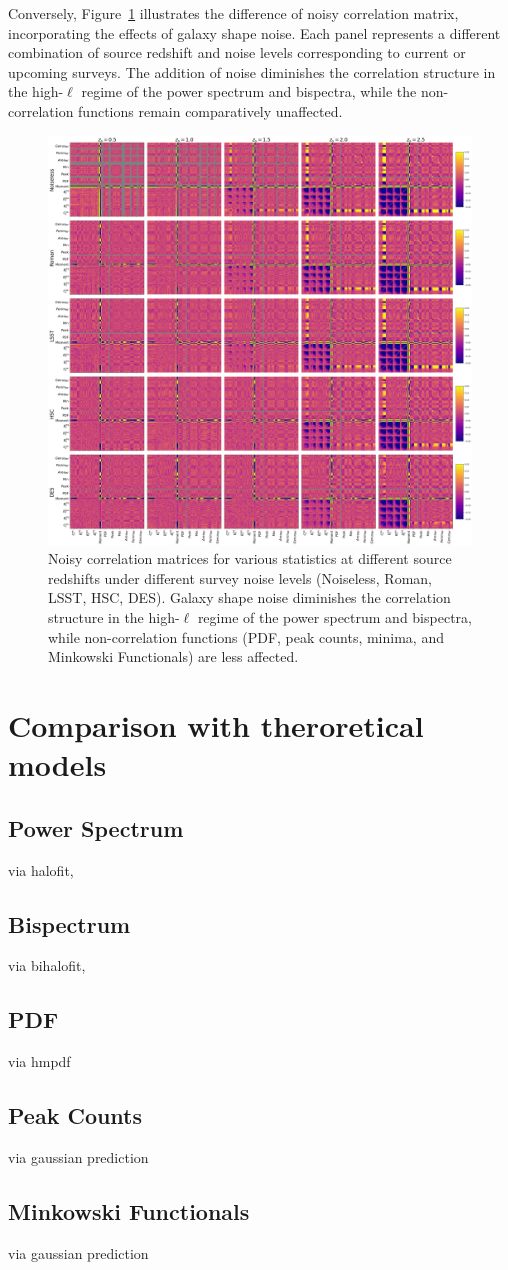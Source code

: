 Conversely, Figure~\ref{fig:corr_ngal} illustrates the difference of noisy correlation matrix, incorporating the effects of galaxy shape noise. Each panel represents a different combination of source redshift and noise levels corresponding to current or upcoming surveys. The addition of noise diminishes the correlation structure in the high-$\ell$ regime of the power spectrum and bispectra, while the non-correlation functions remain comparatively unaffected.
\begin{figure}[h]
    \centering
    \includegraphics[width=\textwidth]{figures/corr_ngal_final.png}
    \caption{Noisy correlation matrices for various statistics at different source redshifts under different survey noise levels (Noiseless, Roman, LSST, HSC, DES). Galaxy shape noise diminishes the correlation structure in the high-$\ell$ regime of the power spectrum and bispectra, while non-correlation functions (PDF, peak counts, minima, and Minkowski Functionals) are less affected.}
    \label{fig:corr_ngal}
\end{figure}

\section{Comparison with theroretical models}
\subsection{Power Spectrum}
via halofit, 

\subsection{Bispectrum}
via bihalofit,

\subsection{PDF}
via hmpdf

\subsection{Peak Counts}
via gaussian prediction

\subsection{Minkowski Functionals}
via gaussian prediction